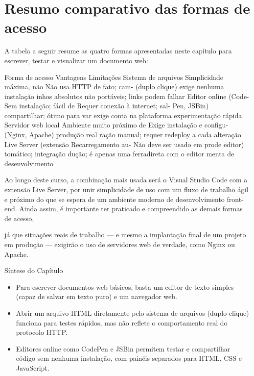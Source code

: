 \section{Resumo comparativo das formas de acesso}

A tabela a seguir resume as quatro formas apresentadas neste capítulo para escrever, testar e visualizar um documento web:

Forma de acesso Vantagens Limitações Sistema de arquivos Simplicidade máxima, não Não usa HTTP de fato; cam- (duplo clique) exige nenhuma instalação inhos absolutos não portáveis; links podem falhar Editor online (Code- Sem instalação; fácil de Requer conexão à internet; sal- Pen, JSBin) compartilhar; ótimo para var exige conta na plataforma experimentação rápida Servidor web local Ambiente muito próximo de Exige instalação e configu- (Nginx, Apache) produção real ração manual; requer redeploy a cada alteração Live Server (extensão Recarregamento au- Não deve ser usado em prode editor) tomático; integração dução; é apenas uma ferradireta com o editor menta de desenvolvimento

Ao longo deste curso, a combinação mais usada será o Visual Studio Code com a extensão Live Server, por unir simplicidade de uso com um fluxo de trabalho ágil e próximo do que se espera de um ambiente moderno de desenvolvimento front-end. Ainda assim, é importante ter praticado e compreendido as demais formas de acesso,

já que situações reais de trabalho — e mesmo a implantação final de um projeto em produção — exigirão o uso de servidores web de verdade, como Nginx ou Apache.

Síntese do Capítulo

\begin{itemize}
  \item Para escrever documentos web básicos, basta um editor de texto simples (capaz de salvar em texto puro) e um navegador web.
\end{itemize}

\begin{itemize}
  \item Abrir um arquivo HTML diretamente pelo sistema de arquivos (duplo clique) funciona para testes rápidos, mas não reflete o comportamento real do protocolo HTTP.
\end{itemize}

\begin{itemize}
  \item Editores online como CodePen e JSBin permitem testar e compartilhar código sem nenhuma instalação, com painéis separados para HTML, CSS e JavaScript.
\end{itemize}

